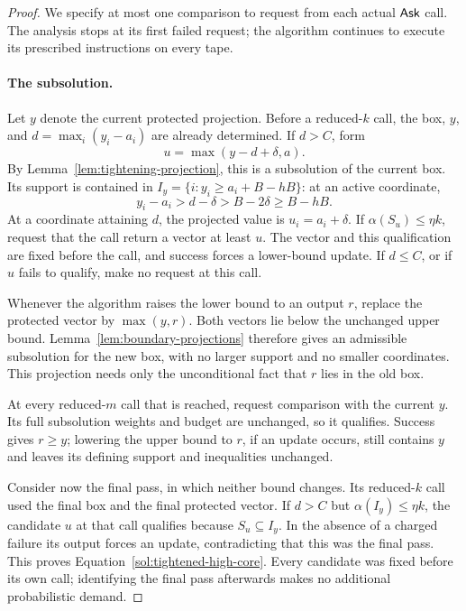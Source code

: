 \begin{proof}
We specify at most one comparison to request from each actual
\(\mathsf{Ask}\) call. The analysis stops at its first failed request; the
algorithm continues to execute its prescribed instructions on every
tape.

\paragraph{The subsolution.}
Let \(y\) denote the current protected projection. Before a
reduced-\(k\) call, the box, \(y\), and
\(d=\max_i(y_i-a_i)\) are already determined. If \(d>C\), form
\[
 u=\max(y-d+\delta,a).
\]
By Lemma~\ref{lem:tightening-projection}, this is a subsolution of
the current box. Its support is contained in
\(I_y=\{i:y_i\ge a_i+B-hB\}\): at an active coordinate,
\[
 y_i-a_i>d-\delta>B-2\delta\ge B-hB.
\]
At a coordinate attaining \(d\), the projected value is
\(u_i=a_i+\delta\). If \(\alpha(S_u)\le\eta k\), request that
the call return a vector at least \(u\). The vector and this
qualification are fixed before the call, and success forces a
lower-bound update. If \(d\le C\), or if \(u\) fails to qualify,
make no request at this call.

Whenever the algorithm raises the lower bound to an output \(r\),
replace the protected vector by \(\max(y,r)\). Both vectors lie
below the unchanged upper bound. Lemma~\ref{lem:boundary-projections}
therefore gives an admissible subsolution for the new box, with no
larger support and no smaller coordinates. This projection needs only
the unconditional fact that \(r\) lies in the old box.

At every reduced-\(m\) call that is reached, request comparison with
the current \(y\). Its full subsolution weights and budget are
unchanged, so it qualifies. Success gives \(r\ge y\); lowering the
upper bound to \(r\), if an update occurs, still contains \(y\)
and leaves its defining support and inequalities unchanged.

Consider now the final pass, in which neither bound changes. Its
reduced-\(k\) call used the final box and the final protected vector.
If \(d>C\) but \(\alpha(I_y)\le\eta k\), the candidate \(u\)
at that call qualifies because \(S_u\subseteq I_y\). In the absence
of a charged failure its output forces an update, contradicting that
this was the final pass. This proves
Equation~\eqref{sol:tightened-high-core}. Every candidate was fixed
before its own call; identifying the final pass afterwards makes no
additional probabilistic demand.


\end{proof}
